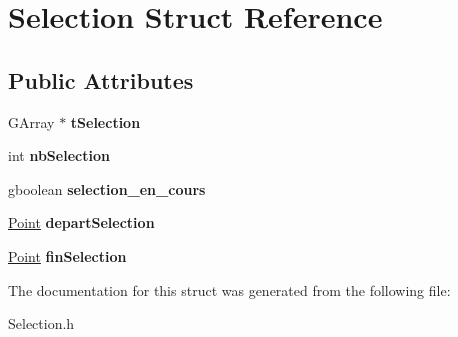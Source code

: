 \hypertarget{structSelection}{
\section{Selection Struct Reference}
\label{structSelection}
}
\subsection*{Public Attributes}
\begin{DoxyCompactItemize}
\item 
\hypertarget{structSelection_afb78d113fe7750ff89c0c2bfb028ebc9}{
GArray $\ast$ {\bfseries tSelection}}
\label{structSelection_afb78d113fe7750ff89c0c2bfb028ebc9}

\item 
\hypertarget{structSelection_aba921f7293c9e68e0e78cedd9ae65b7b}{
int {\bfseries nbSelection}}
\label{structSelection_aba921f7293c9e68e0e78cedd9ae65b7b}

\item 
\hypertarget{structSelection_a2b855934c85d3955d1c8ef76708537fd}{
gboolean {\bfseries selection\_\-en\_\-cours}}
\label{structSelection_a2b855934c85d3955d1c8ef76708537fd}

\item 
\hypertarget{structSelection_a45251bde7df9cfd7be6ebcdfe7548be2}{
\hyperlink{structPoint}{Point} {\bfseries departSelection}}
\label{structSelection_a45251bde7df9cfd7be6ebcdfe7548be2}

\item 
\hypertarget{structSelection_a2f6cb7e30d40e6eb6516c9faca41345d}{
\hyperlink{structPoint}{Point} {\bfseries finSelection}}
\label{structSelection_a2f6cb7e30d40e6eb6516c9faca41345d}

\end{DoxyCompactItemize}


The documentation for this struct was generated from the following file:\begin{DoxyCompactItemize}
\item 
Selection.h\end{DoxyCompactItemize}
